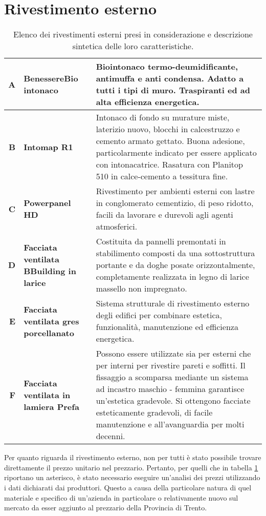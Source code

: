 \section{Rivestimento esterno}
\begin{table}[htbp]
\caption{Elenco dei rivestimenti esterni presi in considerazione e descrizione sintetica delle loro caratteristiche.}
\label{MaterialiRIV}
\centering
\begin{tabularx}{\textwidth}{rXX}
    \toprule
        \textbf{A} & \textbf{BenessereBio intonaco} & Biointonaco termo-deumidificante, antimuffa e anti condensa. 
        Adatto a tutti i tipi di muro. Traspiranti ed ad alta efficienza energetica. \\\midrule
        \textbf{B} & \textbf{Intomap R1 } & Intonaco di fondo su murature miste, laterizio nuovo, blocchi in calcestruzzo e cemento armato gettato.  Buona adesione, particolarmente indicato per essere applicato con intonacatrice. 
        Rasatura con Planitop 510 in calce-cemento a tessitura fine.\\\midrule
        \textbf{C} & \textbf{Powerpanel HD} & Rivestimento per ambienti esterni con lastre in conglomerato cementizio, di peso ridotto, facili da lavorare e durevoli agli agenti atmosferici.\\\midrule
        \textbf{D} & \textbf{Facciata ventilata BBuilding in larice} & Costituita da pannelli premontati in stabilimento composti da una sottostruttura portante e da doghe posate orizzontalmente, completamente realizzata in legno di larice massello non impregnato.\\\midrule
        \textbf{E} & \textbf{Facciata ventilata gres porcellanato} & Sistema strutturale di rivestimento esterno degli edifici per combinare estetica, funzionalità, manutenzione ed efficienza energetica. \\\midrule
        \textbf{F} & \textbf{Facciata ventilata in lamiera Prefa} & Possono essere utilizzate sia per esterni che per interni per rivestire pareti e soffitti. Il fissaggio a scomparsa mediante un sistema ad incastro maschio - femmina garantisce un'estetica gradevole. Si ottengono facciate esteticamente gradevoli, di facile manutenzione e all'avanguardia per molti decenni.\\
    \bottomrule
\end{tabularx}
\end{table}

Per quanto riguarda il rivestimento esterno, non per tutti è stato possibile trovare direttamente il prezzo unitario nel prezzario. 
Pertanto, per quelli che in tabella \ref{MaterialiRIV} riportano un asterisco, è stato necessario eseguire un'analisi dei prezzi utilizzando i dati dichiarati dai produttori. 
Questo a causa della particolare natura di quel materiale e specifico di un'azienda in particolare o relativamente nuovo sul mercato da esser aggiunto al prezzario della Provincia di Trento.

